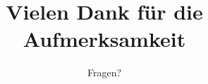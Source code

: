 \title{Vielen Dank für die Aufmerksamkeit}
\subtitle{Fragen?}
\author{}
\institute{}
\date{}
\begin{frame}
    \maketitle
    \thispagestyle{empty}
\end{frame}